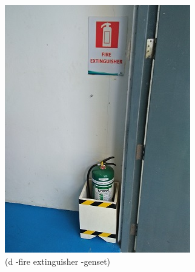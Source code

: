 \begin{figure}
\begin{minipage}[b]{0.22\linewidth}
	\includegraphics[width=\textwidth]{figures/R1P_safety/fire_exhtinguig_genset.jpg}
	\caption*{(d -fire extinguisher -genset)}
\end{minipage}
	\hspace{0.05cm}
\begin{minipage}[b]{0.22\linewidth}
	\centering

\end{minipage}
\end{figure}
